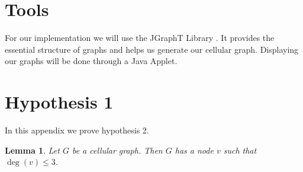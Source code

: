 \documentclass[letterpaper, 10 pt, conference]{ieeeconf}  %
\newtheorem{lem}{Lemma}
\begin{document}
\section{Tools}
For our implementation we will use the JGraphT Library \cite{JGraphT}. It provides the essential structure of graphs and helps us generate our cellular graph. Displaying our graphs will be done through a Java Applet.




\appendices

\section{Hypothesis 1}
In this appendix we prove hypothesis 2.

\begin{lem}\label{lem:degree-constraint}
Let $G$ be a cellular graph. Then $G$ has a node $v$ such that $\deg(v) \leqslant 3$.
\end{lem}
\end{document}
